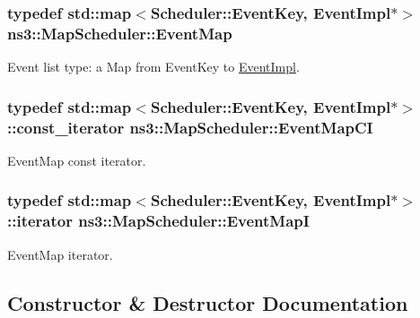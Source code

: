 \subsubsection[{\texorpdfstring{Event\+Map}{EventMap}}]{\setlength{\rightskip}{0pt plus 5cm}typedef std\+::map$<${\bf Scheduler\+::\+Event\+Key}, {\bf Event\+Impl}$\ast$$>$ {\bf ns3\+::\+Map\+Scheduler\+::\+Event\+Map}\hspace{0.3cm}{\ttfamily [private]}}\hypertarget{classns3_1_1MapScheduler_a10af9a8b8b476ca1f5b5f77fd5205947}{}\label{classns3_1_1MapScheduler_a10af9a8b8b476ca1f5b5f77fd5205947}
Event list type\+: a Map from Event\+Key to \hyperlink{classns3_1_1EventImpl}{Event\+Impl}. 
\subsubsection[{\texorpdfstring{Event\+Map\+CI}{EventMapCI}}]{\setlength{\rightskip}{0pt plus 5cm}typedef std\+::map$<${\bf Scheduler\+::\+Event\+Key}, {\bf Event\+Impl}$\ast$$>$\+::const\+\_\+iterator {\bf ns3\+::\+Map\+Scheduler\+::\+Event\+Map\+CI}\hspace{0.3cm}{\ttfamily [private]}}\hypertarget{classns3_1_1MapScheduler_a3b09cafd9c2c9f9010510ed20af54aeb}{}\label{classns3_1_1MapScheduler_a3b09cafd9c2c9f9010510ed20af54aeb}
Event\+Map const iterator. 
\subsubsection[{\texorpdfstring{Event\+MapI}{EventMapI}}]{\setlength{\rightskip}{0pt plus 5cm}typedef std\+::map$<${\bf Scheduler\+::\+Event\+Key}, {\bf Event\+Impl}$\ast$$>$\+::iterator {\bf ns3\+::\+Map\+Scheduler\+::\+Event\+MapI}\hspace{0.3cm}{\ttfamily [private]}}\hypertarget{classns3_1_1MapScheduler_a2a8e917932af199ee16f16ddfcfac9f0}{}\label{classns3_1_1MapScheduler_a2a8e917932af199ee16f16ddfcfac9f0}
Event\+Map iterator. 

\subsection{Constructor \& Destructor Documentation}
